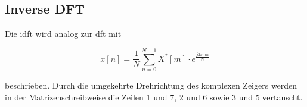 \subsection{Inverse DFT}

Die \gls{idft} wird analog zur \gls{dft} mit 

\begin{equation}\label{eq:idft}
 x \left[ n \right] = \frac{1}{N} \sum^{N-1}_{n=0} X^*[m] \cdot e^{\frac{j 2 \pi m n}{N}}
\end{equation}

beschrieben. Durch die umgekehrte Drehrichtung des komplexen Zeigers werden in der Matrizenschreibweise die Zeilen 1 und 7, 2 und 6 sowie 3 und 5 vertauscht.

